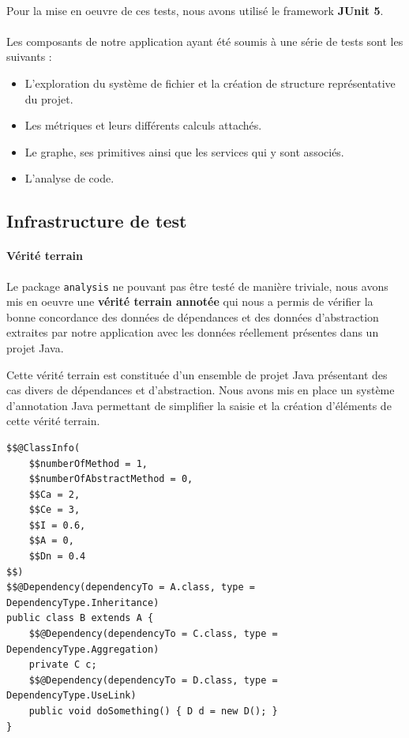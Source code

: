 \documentclass{scrartcl}
\begin{document}
    \paragraph{}Pour la mise en oeuvre de ces tests, nous avons utilisé le framework \textbf{JUnit 5}.
    
    \paragraph{}Les composants de notre application ayant été soumis à une série de tests sont les suivants : 
    \begin{itemize}
    	\item L'exploration du système de fichier et la création de structure représentative du projet.
    	\item Les métriques et leurs différents calculs attachés.
    	\item Le graphe, ses primitives ainsi que les services qui y sont associés.
    	\item L’analyse de code.
    \end{itemize}

\subsection{Infrastructure de test}

    \paragraph{Vérité terrain}Le package \texttt{analysis} ne pouvant pas être testé de manière triviale, nous avons mis en oeuvre une \textbf{vérité terrain annotée} qui nous a permis de vérifier la bonne concordance des données de dépendances et des données d’abstraction extraites par notre application avec les données réellement présentes dans un projet Java.
    
    Cette vérité terrain est constituée d’un ensemble de projet Java présentant des cas divers de dépendances et d'abstraction. Nous avons mis en place un système d’annotation Java permettant de simplifier la saisie et la création d'éléments de cette vérité terrain.
    
\begin{lstlisting}[caption={Exemple de classe annotée}]
$$@ClassInfo(
    $$numberOfMethod = 1,
    $$numberOfAbstractMethod = 0,
    $$Ca = 2,
    $$Ce = 3,
    $$I = 0.6,
    $$A = 0,
    $$Dn = 0.4
$$)
$$@Dependency(dependencyTo = A.class, type = DependencyType.Inheritance)
public class B extends A {
    $$@Dependency(dependencyTo = C.class, type = DependencyType.Aggregation)
    private C c;
    $$@Dependency(dependencyTo = D.class, type = DependencyType.UseLink)
    public void doSomething() { D d = new D(); }
}
\end{lstlisting}
\end{document}
